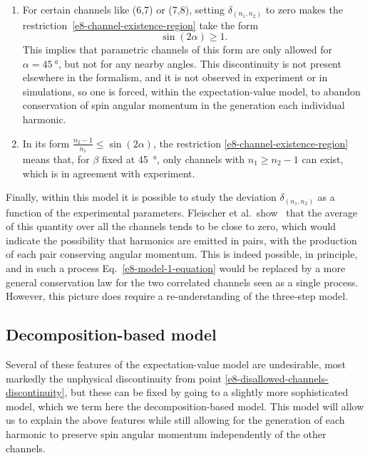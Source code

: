 \begin{enumerate}[label=(\roman*)]
 \item \label{e8-disallowed-channels-discontinuity}
 For certain channels like (6,7) or (7,8), setting $\delta_{(n_1,n_2)}$ to zero makes the restriction~\eqref{e8-channel-existence-region} take the form
 \begin{equation}
 \sin(2\alpha) \geq 1.
 \label{e8-channel-existence-discontinuity}
 \end{equation}
 This implies that parametric channels of this form are only allowed for $\alpha = \SI{45}{\degree}$, but not for any nearby angles. This discontinuity is not present elsewhere in the formalism, and it is not observed in experiment or in simulations, so one is forced, within the expectation-value model, to abandon conservation of spin angular momentum in the generation each individual harmonic.
 
 \item
 In its form $\frac{n_2-1}{n_1}\leq\sin(2\alpha)$, the restriction \eqref{e8-channel-existence-region} means that, for $\beta$ fixed at \SI{45}{\degree}, only channels with $n_1\geq n_2-1$ can exist, which is in agreement with experiment.

\end{enumerate}


Finally, within this model it is possible to study the deviation $\delta_{(n_1,n_2)}$ as a function of the experimental parameters. Fleischer et al.\ show~\cite{fleischer_spin_2014} that the average of this quantity over all the channels tends to be close to zero, which would indicate the possibility that harmonics are emitted in pairs, with the production of each pair conserving angular momentum. This is indeed possible, in principle, and in such a process Eq.~\eqref{e8-model-1-equation} would be replaced by a more general conservation law for the two correlated channels seen as a single process. However, this picture does require a re-understanding of the three-step model.





\subsection{Decomposition-based model}
\label{sec:decomposition-based-model}

Several of these features of the expectation-value model are undesirable, most markedly the unphysical discontinuity from point \ref{e8-disallowed-channels-discontinuity}, but these can be fixed by going to a slightly more sophisticated model, which we term here the decomposition-based model. This model will allow us to explain the above features while still allowing for the generation of each harmonic to preserve spin angular momentum independently of the other channels.


